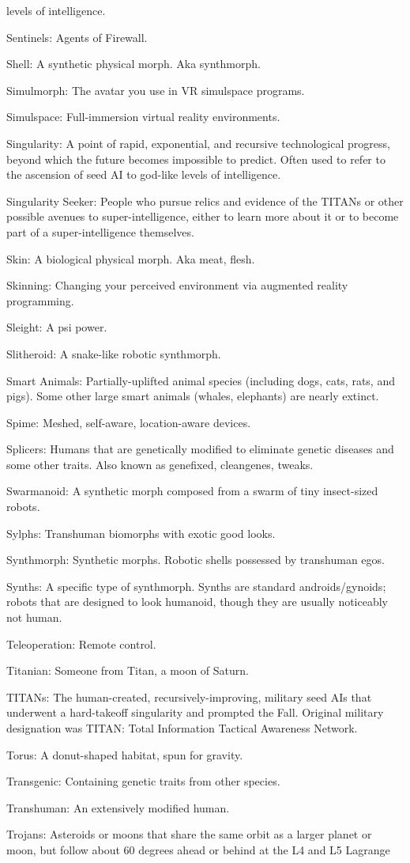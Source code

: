 levels of intelligence. \item Sentinels: Agents of Firewall. \item Shell: A synthetic physical morph. Aka synthmorph. \item Simulmorph: The avatar you use in VR simulspace programs. \item Simulspace: Full-immersion virtual reality environments. \item Singularity: A point of rapid, exponential, and recursive technological progress, beyond which the future becomes impossible to predict. Often used to refer to the ascension of seed AI to god-like levels of intelligence. \item Singularity Seeker: People who pursue relics and evidence of the TITANs or other possible avenues to super-intelligence, either to learn more about it or to become part of a super-intelligence themselves. \item Skin: A biological physical morph. Aka meat, flesh. \item Skinning: Changing your perceived environment via augmented reality programming. \item Sleight: A psi power. \item Slitheroid: A snake-like robotic synthmorph. \item Smart Animals: Partially-uplifted animal species (including dogs, cats, rats, and pigs). Some other large smart animals (whales, elephants) are nearly extinct. \item Spime: Meshed, self-aware, location-aware devices. \item Splicers: Humans that are genetically modified to eliminate genetic diseases and some other traits. Also known as genefixed, cleangenes, tweaks. \item Swarmanoid: A synthetic morph composed from a swarm of tiny insect-sized robots. \item Sylphs: Transhuman biomorphs with exotic good looks. \item Synthmorph: Synthetic morphs. Robotic shells possessed by transhuman egos. \item Synths: A specific type of synthmorph. Synths are standard androids/gynoids; robots that are designed to look humanoid, though they are usually noticeably not human. \item Teleoperation: Remote control. \item Titanian: Someone from Titan, a moon of Saturn. \item TITANs: The human-created, recursively-improving, military seed AIs that underwent a hard-takeoff singularity and prompted the Fall. Original military designation was TITAN: Total Information Tactical Awareness Network. \item Torus: A donut-shaped habitat, spun for gravity. \item Transgenic: Containing genetic traits from other species. \item Transhuman: An extensively modified human. \item Trojans: Asteroids or moons that share the same orbit as a larger planet or moon, but follow about 60 degrees ahead or behind at the L4 and L5 Lagrange 